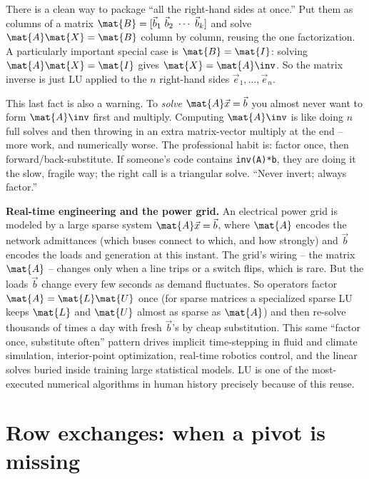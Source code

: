 There is a clean way to package ``all the right-hand sides at once.'' Put them as columns of
a matrix $\mat{B}=[\vec{b}_1\ \vec{b}_2\ \cdots\ \vec{b}_k]$ and solve $\mat{A}\mat{X}=\mat{B}$
column by column, reusing the one factorization. A particularly important special case is
$\mat{B}=\mat{I}$: solving $\mat{A}\mat{X}=\mat{I}$ gives $\mat{X}=\mat{A}\inv$. So the
matrix inverse is just LU applied to the $n$ right-hand sides $\vec{e}_1,\dots,\vec{e}_n$.

\begin{trapbox}
This last fact is also a warning. To \emph{solve} $\mat{A}\vec{x}=\vec{b}$ you almost never
want to form $\mat{A}\inv$ first and multiply. Computing $\mat{A}\inv$ is like doing $n$ full
solves and then throwing in an extra matrix-vector multiply at the end -- more work, and
numerically worse. The professional habit is: factor once, then forward/back-substitute. If
someone's code contains \texttt{inv(A)*b}, they are doing it the slow, fragile way; the
right call is a triangular solve. ``Never invert; always factor.''
\end{trapbox}

\begin{applicationbox}
\textbf{Real-time engineering and the power grid.} An electrical power grid is modeled by a
large sparse system $\mat{A}\vec{x}=\vec{b}$, where $\mat{A}$ encodes the network admittances
(which buses connect to which, and how strongly) and $\vec{b}$ encodes the loads and
generation at this instant. The grid's wiring -- the matrix $\mat{A}$ -- changes only when a
line trips or a switch flips, which is rare. But the loads $\vec{b}$ change every few
seconds as demand fluctuates. So operators factor $\mat{A}=\mat{L}\mat{U}$ once (for sparse
matrices a specialized sparse LU keeps $\mat{L}$ and $\mat{U}$ almost as sparse as $\mat{A}$)
and then re-solve thousands of times a day with fresh $\vec{b}$'s by cheap substitution.
This same ``factor once, substitute often'' pattern drives implicit time-stepping in fluid
and climate simulation, interior-point optimization, real-time robotics control, and the
linear solves buried inside training large statistical models. LU is one of the most-executed
numerical algorithms in human history precisely because of this reuse.
\end{applicationbox}

\section{Row exchanges: when a pivot is missing}
\label{ch09:pivoting}

